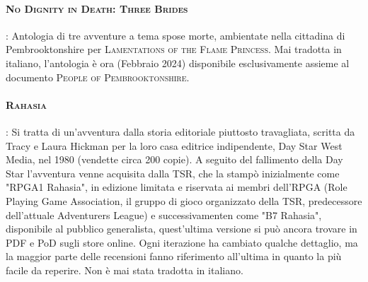 \paragraph{\textsc{No Dignity in Death: Three Brides}}: Antologia di tre avventure a tema spose morte, ambientate nella cittadina di Pembrooktonshire per \textsc{Lamentations of the Flame Princess}. Mai tradotta in italiano, l'antologia è ora (Febbraio 2024) disponibile esclusivamente assieme al documento \textsc{People of Pembrooktonshire}.

\paragraph{\textsc{Rahasia}}: Si tratta di un'avventura dalla storia editoriale piuttosto travagliata, scritta da Tracy e Laura Hickman per la loro casa editrice indipendente, Day Star West Media, nel 1980 (vendette circa 200 copie). A seguito del fallimento della Day Star l'avventura venne acquisita dalla TSR, che la stampò inizialmente come "RPGA1 Rahasia", in edizione limitata e riservata ai membri dell'RPGA (Role Playing Game Association, il gruppo di gioco organizzato della TSR, predecessore dell'attuale Adventurers League) e successivamenten come "B7 Rahasia", disponibile al pubblico generalista, quest'ultima versione si può ancora trovare in PDF e PoD sugli store online. Ogni iterazione ha cambiato qualche dettaglio, ma la maggior parte delle recensioni fanno riferimento all'ultima in quanto la più facile da reperire. Non è mai stata tradotta in italiano.